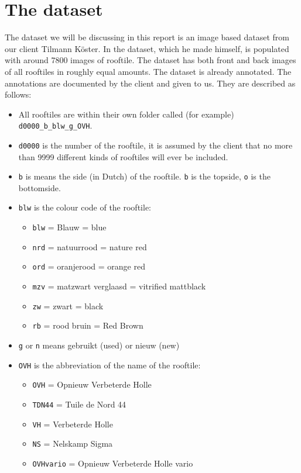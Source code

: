 \section{The dataset}
\begin{fullwidth}
	The dataset we will be discussing in this report is an image based dataset from our client Tilmann Köster. 
	In the dataset, which he made himself, is populated with around 7800 images of rooftile. 
	The dataset has both front and back images of all rooftiles in roughly equal amounts. 
	The dataset is already annotated. The annotations are documented by the client and given to us. They are described as follows:
	\begin{itemize}
		\item All rooftiles are within their own folder called (for example) \verb|d0000_b_blw_g_OVH|.
		\item \verb|d0000| is the number of the rooftile, it is assumed by the client that no more than 9999 different kinds of rooftiles will ever be included.
		\item \verb|b| is means the side (in Dutch) of the rooftile. \verb|b| is the topside, \verb|o| is the bottomside.
		\item \verb|blw| is the colour code of the rooftile:
		\begin{itemize}
			\item \verb|blw| = Blauw = blue
			\item \verb|nrd| = natuurrood = nature red
			\item \verb|ord| = oranjerood = orange red
			\item \verb|mzv| = matzwart verglaasd = vitrified mattblack
			\item \verb|zw| = zwart = black
			\item \verb|rb| = rood bruin = Red Brown			
		\end{itemize} 
		\item \verb|g| or \verb|n| means gebruikt (used) or nieuw (new)
		\item \verb|OVH| is the abbreviation of the name of the rooftile:
		\begin{itemize}
			\item \verb|OVH| = Opnieuw Verbeterde Holle
			\item \verb|TDN44| = Tuile de Nord 44
			\item \verb|VH| = Verbeterde Holle 
			\item \verb|NS| = Nelskamp Sigma
			\item \verb|OVHvario| = Opnieuw Verbeterde Holle vario

\end{itemize}
\end{itemize}
\end{fullwidth}
